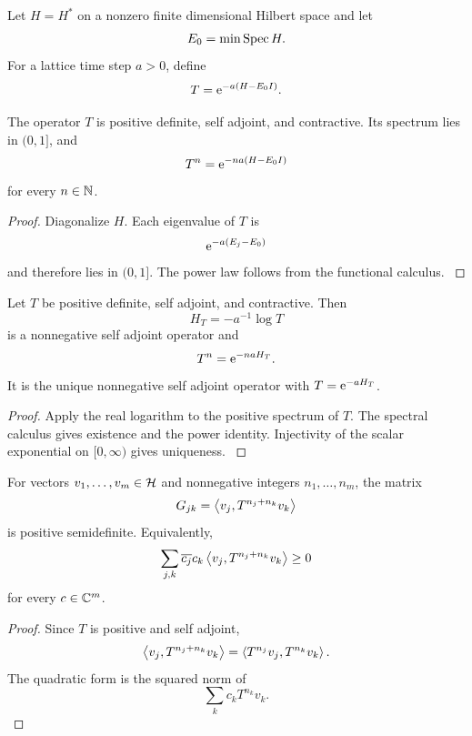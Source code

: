 Let \(H=H^*\) on a nonzero finite dimensional Hilbert space and let
\[
E_0=\min\operatorname{Spec} H.
\]
For a lattice time step \(a>0\), define
\[
T=\mathrm e^{-a(H-E_0I)}.
\]

\begin{theorem}\label{strong:theorem:036}\label{strong:thm:euclidean_transfer}
The operator \(T\) is positive definite, self adjoint, and contractive. Its spectrum lies in \((0,1]\), and
\[
T^n=\mathrm e^{-na(H-E_0I)}
\]
for every \(n\in\mathbb N\).
\end{theorem}

\begin{proof}\label{strong:proof:056}
Diagonalize \(H\). Each eigenvalue of \(T\) is
\[
\mathrm e^{-a(E_j-E_0)}
\]
and therefore lies in \((0,1]\). The power law follows from the functional calculus.
\label{strong:proof:056:end}\end{proof}

\begin{theorem}\label{strong:theorem:037}\label{strong:thm:transfer_logarithm}
Let \(T\) be positive definite, self adjoint, and contractive. Then
\[
H_T=-a^{-1}\log T
\]
is a nonnegative self adjoint operator and
\[
T^n=\mathrm e^{-naH_T}.
\]
It is the unique nonnegative self adjoint operator with \(T=\mathrm e^{-aH_T}\).
\end{theorem}

\begin{proof}\label{strong:proof:057}
Apply the real logarithm to the positive spectrum of \(T\). The spectral calculus gives existence and the power identity. Injectivity of the scalar exponential on \([0,\infty)\) gives uniqueness.
\label{strong:proof:057:end}\end{proof}

\begin{theorem}\label{strong:theorem:038}\label{strong:thm:finite_reflection_positivity}
For vectors \(v_1,\ldots,v_m\in\mathcal H\) and nonnegative integers \(n_1,\ldots,n_m\), the matrix
\[
G_{jk}=\left\langle v_j,T^{n_j+n_k}v_k\right\rangle
\]
is positive semidefinite. Equivalently,
\[
\sum_{j,k}\overline{c_j}c_k
\left\langle v_j,T^{n_j+n_k}v_k\right\rangle
\geq0
\]
for every \(c\in\mathbb C^m\).
\end{theorem}

\begin{proof}\label{strong:proof:058}
Since \(T\) is positive and self adjoint,
\[
\left\langle v_j,T^{n_j+n_k}v_k\right\rangle
=
\left\langle T^{n_j}v_j,T^{n_k}v_k\right\rangle.
\]
The quadratic form is the squared norm of
\[
\sum_kc_kT^{n_k}v_k.
\]
\label{strong:proof:058:end}\end{proof}

